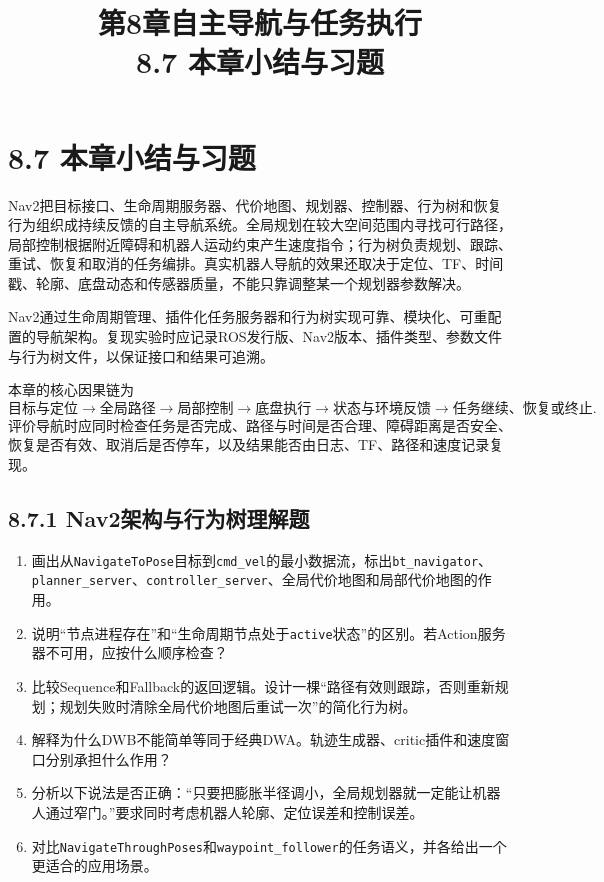 \documentclass[UTF8,zihao=-4]{ctexart}
\title{第8章自主导航与任务执行\\\large 8.7 本章小结与习题}
\author{}\date{}
\begin{document}
\maketitle

\section*{8.7 本章小结与习题}

Nav2把目标接口、生命周期服务器、代价地图、规划器、控制器、行为树和恢复行为组织成持续反馈的自主导航系统。全局规划在较大空间范围内寻找可行路径，局部控制根据附近障碍和机器人运动约束产生速度指令；行为树负责规划、跟踪、重试、恢复和取消的任务编排。真实机器人导航的效果还取决于定位、TF、时间戳、轮廓、底盘动态和传感器质量，不能只靠调整某一个规划器参数解决。

Nav2通过生命周期管理、插件化任务服务器和行为树实现可靠、模块化、可重配置的导航架构。复现实验时应记录ROS发行版、Nav2版本、插件类型、参数文件与行为树文件，以保证接口和结果可追溯\cite{macenski2020nav2,navigation2source}。

本章的核心因果链为
\begin{equation}
  \text{目标与定位}
  \rightarrow \text{全局路径}
  \rightarrow \text{局部控制}
  \rightarrow \text{底盘执行}
  \rightarrow \text{状态与环境反馈}
  \rightarrow \text{任务继续、恢复或终止}.
\end{equation}
评价导航时应同时检查任务是否完成、路径与时间是否合理、障碍距离是否安全、恢复是否有效、取消后是否停车，以及结果能否由日志、TF、路径和速度记录复现。

\subsection*{8.7.1 Nav2架构与行为树理解题}

\begin{enumerate}[label=\arabic*.]
  \item 画出从\texttt{NavigateToPose}目标到\texttt{cmd\_vel}的最小数据流，标出\texttt{bt\_navigator}、\texttt{planner\_server}、\texttt{controller\_server}、全局代价地图和局部代价地图的作用。
  \item 说明“节点进程存在”和“生命周期节点处于\texttt{active}状态”的区别。若Action服务器不可用，应按什么顺序检查？
  \item 比较Sequence和Fallback的返回逻辑。设计一棵“路径有效则跟踪，否则重新规划；规划失败时清除全局代价地图后重试一次”的简化行为树。
  \item 解释为什么DWB不能简单等同于经典DWA。轨迹生成器、critic插件和速度窗口分别承担什么作用？
  \item 分析以下说法是否正确：“只要把膨胀半径调小，全局规划器就一定能让机器人通过窄门。”要求同时考虑机器人轮廓、定位误差和控制误差。
  \item 对比\texttt{NavigateThroughPoses}和\texttt{waypoint\_follower}的任务语义，并各给出一个更适合的应用场景。
\end{enumerate}
\end{document}
